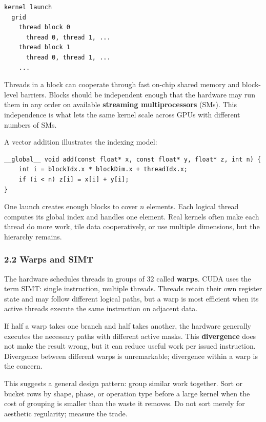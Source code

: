 \documentclass[
  10pt,
  letterpaper,
]{article}
\begin{document}
\begin{verbatim}
kernel launch
  grid
    thread block 0
      thread 0, thread 1, ...
    thread block 1
      thread 0, thread 1, ...
    ...
\end{verbatim}

Threads in a block can cooperate through fast on-chip shared memory and
block-level barriers. Blocks should be independent enough that the
hardware may run them in any order on available \textbf{streaming
multiprocessors} (SMs). This independence is what lets the same kernel
scale across GPUs with different numbers of SMs.

A vector addition illustrates the indexing model:

\begin{verbatim}
__global__ void add(const float* x, const float* y, float* z, int n) {
    int i = blockIdx.x * blockDim.x + threadIdx.x;
    if (i < n) z[i] = x[i] + y[i];
}
\end{verbatim}

One launch creates enough blocks to cover \(n\) elements. Each logical
thread computes its global index and handles one element. Real kernels
often make each thread do more work, tile data cooperatively, or use
multiple dimensions, but the hierarchy remains.

\subsubsection{2.2 Warps and SIMT}\label{22-warps-and-simt}

The hardware schedules threads in groups of 32 called \textbf{warps}.
CUDA uses the term SIMT: single instruction, multiple threads. Threads
retain their own register state and may follow different logical paths,
but a warp is most efficient when its active threads execute the same
instruction on adjacent data.

If half a warp takes one branch and half takes another, the hardware
generally executes the necessary paths with different active masks. This
\textbf{divergence} does not make the result wrong, but it can reduce
useful work per issued instruction. Divergence between different warps
is unremarkable; divergence within a warp is the concern.

This suggests a general design pattern: group similar work together.
Sort or bucket rows by shape, phase, or operation type before a large
kernel when the cost of grouping is smaller than the waste it removes.
Do not sort merely for aesthetic regularity; measure the trade.
\end{document}
